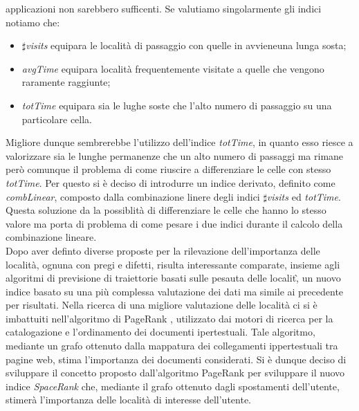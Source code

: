 applicazioni non sarebbero sufficenti. Se valutiamo singolarmente gli indici notiamo che:
\begin{itemize}
\item $\sharp$\textit{visits} equipara le localit\`a di passaggio con quelle in avvieneuna lunga sosta;
\item \textit{avgTime} equipara localit\`a frequentemente visitate a quelle che vengono raramente raggiunte;
\item \textit{totTime} equipara sia le lughe soste che l'alto numero di passaggio su una particolare cella.
\end{itemize}
Migliore dunque sembrerebbe l'utilizzo dell'indice \textit{totTime}, in quanto esso riesce a valorizzare
sia le lunghe permanenze che un alto numero di passaggi ma rimane per\`o comunque
il problema di come riuscire a differenziare le celle con stesso \textit{totTime}.
Per questo si \`e deciso di introdurre un indice derivato, definito come \textit{combLinear},
composto dalla combinazione linere degli indici $\sharp$\textit{visits} ed \textit{totTime}.
Questa soluzione da la possiblit\`a di differenziare le celle che hanno lo stesso valore ma
porta di problema di come pesare i due indici durante il calcolo della combinazione lineare.\\

Dopo aver definto diverse proposte per la rilevazione dell'importanza delle localit\`a,
ognuna con pregi e difetti, risulta interessante comparate, insieme agli algoritmi di
previsione di traiettorie basati sulle pesauta delle localit\`, un nuovo indice basato su
una pi\`u complessa valutazione dei dati ma simile ai precedente per risultati.
Nella ricerca di una migliore valutazione delle localit\`a ci si \`e imbattuiti nell'algoritmo
di PageRank \cite{cit_45}, utilizzato dai motori di ricerca per la catalogazione e
l'ordinamento dei documenti ipertestuali. Tale algoritmo, mediante un grafo ottenuto dalla
mappatura dei collegamenti ippertestuali tra pagine web, stima l'importanza dei documenti
considerati. Si \`e dunque deciso di sviluppare il concetto proposto dall'algoritmo PageRank
per sviluppare il nuovo indice \textit{SpaceRank} che, mediante il grafo ottenuto
dagli spostamenti dell'utente, stimer\`a l'importanza delle localit\`a di interesse dell'utente.

